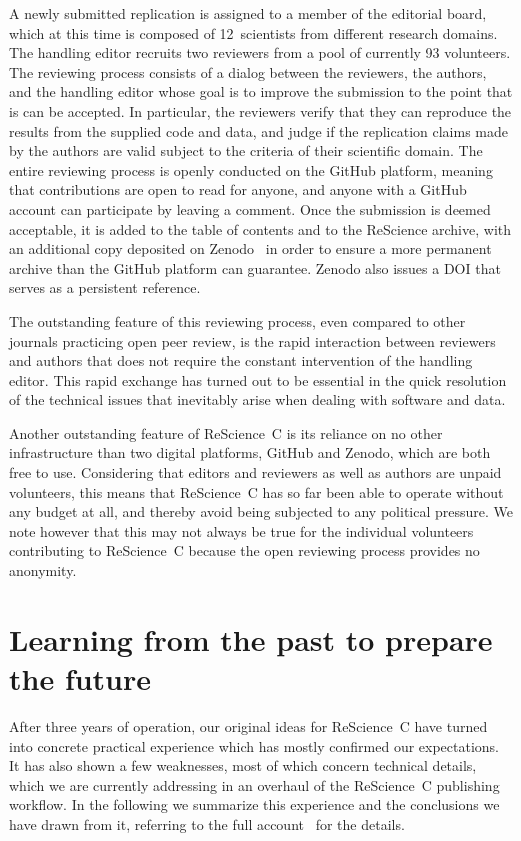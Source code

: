 \documentclass[runningheads]{llncs}
\begin{document}
A newly submitted replication is assigned to a member of the editorial board, which at this time is composed of 12~scientists from different research domains. The handling editor recruits two reviewers from a pool of currently 93 volunteers. The reviewing process consists of a dialog between the reviewers, the authors, and the handling editor whose goal is to improve the submission to the point that is can be accepted. In particular, the reviewers verify that they can reproduce the results from the supplied code and data, and judge if the replication claims made by the authors are valid subject to the criteria of their scientific domain. The entire reviewing process is openly conducted on the GitHub platform, meaning that contributions are open to read for anyone, and anyone with a GitHub account can participate by leaving a comment. Once the submission is deemed acceptable, it is added to the table of contents and to the ReScience archive, with an additional copy deposited on Zenodo~\cite{Zenodo} in order to ensure a more permanent archive than the GitHub platform can guarantee. Zenodo also issues a DOI that serves as a persistent reference.

The outstanding feature of this reviewing process, even compared to other journals practicing open peer review, is the rapid interaction between reviewers and authors that does not require the constant intervention of the handling editor. This rapid exchange has turned out to be essential in the quick resolution of the technical issues that inevitably arise when dealing with software and data.

Another outstanding feature of ReScience~C is its reliance on no other infrastructure than two digital platforms, GitHub and Zenodo, which are both free to use. Considering that editors and reviewers as well as authors are unpaid volunteers, this means that ReScience~C has so far been able to operate without any budget at all, and thereby avoid being subjected to any political pressure. We note however that this may not always be true for the individual volunteers contributing to ReScience~C because the open reviewing process provides no anonymity.

\section{Learning from the past to prepare the future}

After three years of operation, our original ideas for ReScience~C have turned into concrete practical experience which has mostly confirmed our expectations. It has also shown a few weaknesses, most of which concern technical details, which we are currently addressing in an overhaul of the ReScience~C publishing workflow. In the following we summarize this experience and the conclusions we have drawn from it, referring to the full account~\cite{RougierSustainablecomputationalscience2017} for the details.
\end{document}

